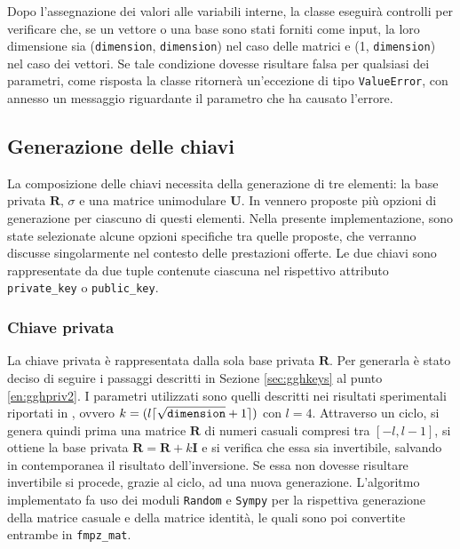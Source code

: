Dopo l'assegnazione dei valori alle variabili interne, la classe eseguirà controlli 
per verificare che, se un vettore o una base sono stati forniti come input, la loro 
dimensione sia (\texttt{dimension}, \texttt{dimension})
nel caso delle matrici e (1, \texttt{dimension}) nel caso dei vettori. Se tale condizione
dovesse risultare falsa per qualsiasi dei parametri, come risposta la classe ritornerà
un'eccezione di tipo \texttt{ValueError}, con annesso un messaggio riguardante il parametro
che ha causato l'errore.

\subsection{Generazione delle chiavi}

La composizione delle chiavi necessita della generazione di tre elementi: 
la base privata $\mathbf{R}$, $\sigma$ e una matrice unimodulare $\mathbf{U}$. 
In \cite{GGH97} vennero proposte più opzioni di generazione
per ciascuno di questi elementi. Nella presente implementazione, sono state selezionate 
alcune opzioni specifiche tra quelle proposte, che verranno discusse singolarmente nel contesto
delle prestazioni offerte. Le due chiavi sono rappresentate da due tuple contenute ciascuna
nel rispettivo attributo \texttt{private\_key} o \texttt{public\_key}.

\subsubsection{Chiave privata}
\label{sec:gghimplementationprivkey}
La chiave privata è rappresentata dalla sola base privata $\mathbf{R}$.
Per generarla è stato deciso di seguire i passaggi descritti 
in Sezione \ref{sec:gghkeys} al punto \ref{en:gghpriv2}. I parametri utilizzati sono
quelli descritti nei risultati sperimentali riportati in \cite{GGH97}, ovvero 
$k = (l \lceil \sqrt{\text{\texttt{dimension}}} + 1 \rceil)$ con $l = 4$. 
Attraverso un ciclo, si genera quindi prima una matrice $\mathbf{R}$ di numeri casuali 
compresi tra $[-l, l-1]$, si ottiene la base privata $\mathbf{R} = \mathbf{R}+k\mathbf{I}$ 
e si verifica che essa sia invertibile, salvando in contemporanea il risultato dell'inversione.
Se essa non dovesse risultare invertibile si procede, grazie al ciclo, ad una nuova generazione. 
L'algoritmo implementato fa uso dei moduli \texttt{Random} e \texttt{Sympy} per la rispettiva
generazione della matrice casuale e della matrice identità, le quali sono poi convertite
entrambe in \texttt{fmpz\_mat}. 

